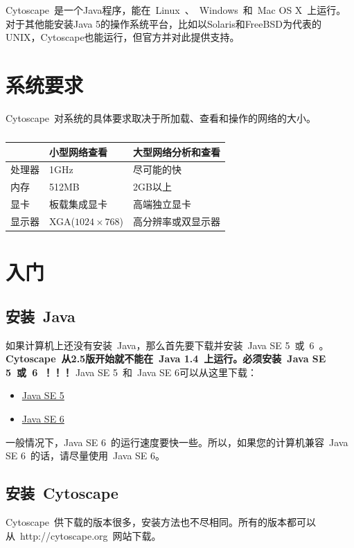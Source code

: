 Cytoscape~是一个Java程序，能在~Linux~、~Windows~和~Mac OS X~上运行。对于其他能安装Java 5的操作系统平台，比如以Solaris和FreeBSD为代表的UNIX，Cytoscape也能运行，但官方并对此提供支持。

\section{系统要求}
	Cytoscape~对系统的具体要求取决于所加载、查看和操作的网络的大小。

	\begin{table}[htbp]
	\label{tabel:2}
	\centering
	\begin{tabular}{|l|l|l|}
	\hline
	 & 小型网络查看 & 大型网络分析和查看 \\
	\hline
	处理器 & 1GHz & 尽可能的快\\
	\hline
	内存   & 512MB & 2GB以上 \\
	\hline
	显卡   & 板载集成显卡 & 高端独立显卡 \\
	\hline
	显示器 & XGA($1024 \times 768$) & 高分辨率或双显示器 \\
	\hline
	\end{tabular}
	\caption{}
	\end{table}

\section{入门}
	\subsection{安装~Java}
		如果计算机上还没有安装~Java，那么首先要下载并安装~Java SE 5~或~6~。\textbf{Cytoscape~从2.5版开始就不能在~Java 1.4~上运行。必须安装~Java SE 5~或~6~！！！}
		Java SE 5~和~Java SE 6可以从这里下载：
		\begin{itemize}
		\item \href{http://java.sun.com/javase/downloads/index_jdk5.jsp}{Java SE 5}
		\item \href{http://java.sun.com/javase/downloads/index.jsp}{Java SE 6}
		\end{itemize}
	
		一般情况下，Java SE 6~的运行速度要快一些。所以，如果您的计算机兼容~Java SE 6~的话，请尽量使用~Java SE 6。

	\subsection{安装~Cytoscape}
		Cytoscape~供下载的版本很多，安装方法也不尽相同。所有的版本都可以从~http://cytoscape.org~网站下载。
		
